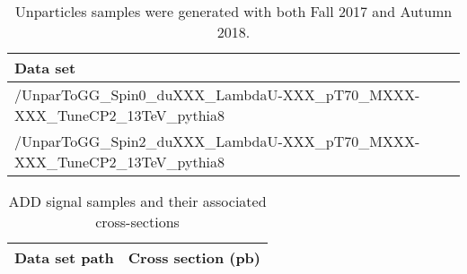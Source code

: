 \begin{table}[!htbp]
	\caption{Unparticles samples were generated with both Fall 2017 and Autumn 2018.
}
	\centering
	\vspace{\baselineskip}
	\begin{tabular}{lc}
	\hline \hline
	Data set\\
	\hline
	/UnparToGG\_Spin0\_duXXX\_LambdaU-XXX\_pT70\_MXXX-XXX\_TuneCP2\_13TeV\_pythia8 \\
	/UnparToGG\_Spin2\_duXXX\_LambdaU-XXX\_pT70\_MXXX-XXX\_TuneCP2\_13TeV\_pythia8 \\
	\hline \hline
	\end{tabular}
	\label{table:UnparticlesSamples}
\end{table}

\begin{landscape}
\begin{table}[!htbp]
       \caption{ ADD signal samples and their associated cross-sections }
       \centering
       \vspace{\baselineskip}
       \begin{tabular}{lc}
       \hline \hline
       Data set path & Cross section (pb)\\
       \hline


\end{tabular}
\end{table}
\end{landscape}
